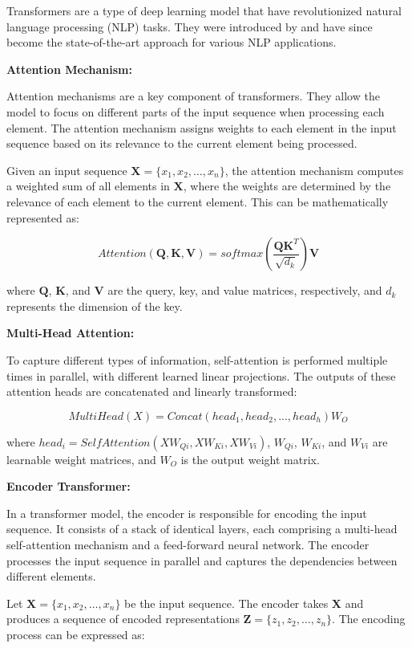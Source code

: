 \documentclass[a4paper,12pt]{article}
\begin{document}
Transformers are a type of deep learning model that have revolutionized natural language processing (NLP) tasks. They were introduced by \cite{attention} and have since become the state-of-the-art approach for various NLP applications.

\textbf{Attention Mechanism:}

Attention mechanisms are a key component of transformers. They allow the model to focus on different parts of the input sequence when processing each element. The attention mechanism assigns weights to each element in the input sequence based on its relevance to the current element being processed.

Given an input sequence $\mathbf{X} = \{x_1, x_2, \ldots, x_n\}$, the attention mechanism computes a weighted sum of all elements in $\mathbf{X}$, where the weights are determined by the relevance of each element to the current element. This can be mathematically represented as:

$$Attention(\mathbf{Q}, \mathbf{K}, \mathbf{V}) = softmax\left(\frac{\mathbf{QK}^T}{\sqrt{d_k}}\right) \mathbf{V}$$

where $\mathbf{Q}$, $\mathbf{K}$, and $\mathbf{V}$ are the query, key, and value matrices, respectively, and $d_k$ represents the dimension of the key.

\textbf{Multi-Head Attention:}

To capture different types of information, self-attention is performed multiple times in parallel, with different learned linear projections. The outputs of these attention heads are concatenated and linearly transformed:

$$
MultiHead(X) = Concat(head_1, head_2, ..., head_h)W_O
$$

where $head_i = SelfAttention(XW_{Qi}, XW_{Ki}, XW_{Vi})$, $W_{Qi}$, $W_{Ki}$, and $W_{Vi}$ are learnable weight matrices, and $W_O$ is the output weight matrix.

\textbf{Encoder Transformer:}

In a transformer model, the encoder is responsible for encoding the input sequence. It consists of a stack of identical layers, each comprising a multi-head self-attention mechanism and a feed-forward neural network. The encoder processes the input sequence in parallel and captures the dependencies between different elements.

Let $\mathbf{X} = \{x_1, x_2, \ldots, x_n\}$ be the input sequence. The encoder takes $\mathbf{X}$ and produces a sequence of encoded representations $\mathbf{Z} = \{z_1, z_2, \ldots, z_n\}$. The encoding process can be expressed as:
\end{document}
